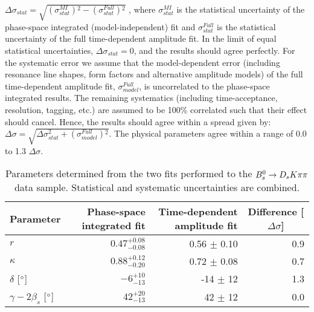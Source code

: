 $\Delta \sigma_{stat} = \sqrt{ (\sigma^{MI}_{stat}){}^2- (\sigma^{Full}_{stat}){}^2}$ ,
where $\sigma^{MI}_{stat}$ is the statistical uncertainty of the phase-space integrated (model-independent) fit 
and $\sigma^{Full}_{stat}$ is the statistical uncertainty of the full time-dependent amplitude fit.
In the limit of equal statistical uncertainties, $\Delta \sigma_{stat} = 0$,  and the results should agree perfectly.
For the systematic error we assume that the model-dependent error (including resonance line shapes, form factors and alternative amplitude models) of the full time-dependent amplitude fit, 
$\sigma^{Full}_{model}$, is uncorrelated 
to the phase-space integrated results.
The remaining systematics (including time-acceptance, resolution, tagging, etc.) are assumed to be 100\% correlated such that their effect should cancel.
Hence, the results should agree within a spread given by:
$\Delta \sigma = \sqrt{ \Delta \sigma_{stat}^2 + (\sigma^{Full}_{model}){}^2}$.
The physical parameters agree within a range of 0.0 to 1.3 $\Delta \sigma$. 


\begin{table}[h]
\centering
\caption{Parameters determined from the two fits performed to the ${{B}^0_{s}}\rightarrow{\ensuremath{{D}_{s}}}{\ensuremath{K}}{\ensuremath{\pi}}{\ensuremath{\pi}}$ data sample. 
 Statistical and systematic uncertainties are combined.}
\begin{tabular}{l r r r }
\hline
\hline
Parameter & Phase-space integrated fit & Time-dependent amplitude fit &\multicolumn{1}{c}{ Difference [$\Delta\sigma$]} \\
\hline
$r$ & $0.47^{+0.08}_{-0.08}$  & 0.56 $\pm$ 0.10 & 0.9 \\
$\kappa$ & $0.88^{+0.12}_{-0.20}$  & 0.72 $\pm$ 0.08& 0.7\\
$\delta$ [$^{\circ}$] &  $-6^{+10}_{-13}$ & -14 $\pm$ 12 & 1.3\\
$\gamma - 2 \beta_s$ [$^{\circ}$] & $42^{+20}_{-13} $ & 42 $\pm$ 12 & 0.0\\
\hline
\hline
\end{tabular}
\label{tab:ResultSummary}
\end{table}

